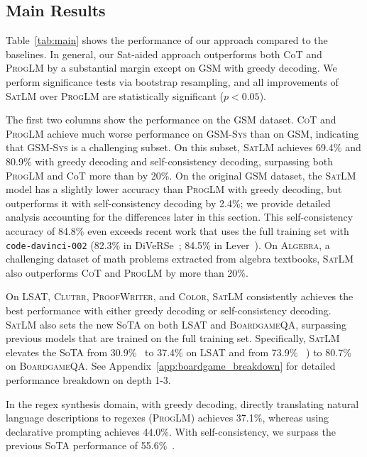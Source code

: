 \documentclass{article}
\theoremstyle{definition}
\newcommand\ttsmall[1]{\texttt{\small #1}}
\newcommand{\gsm}{\textsc{GSM}}
\newcommand{\gsmsys}{\textsc{GSM-Sys}}
\newcommand{\algebra}{\textsc{Algebra}}
\newcommand{\lsat}{\textsc{LSAT}}
\newcommand{\clutrr}{\textsc{Clutrr}}
\newcommand{\colorobj}{\textsc{Color}}
\newcommand{\proofwriter}{\textsc{ProofWriter}}
\newcommand{\boardgame}{\textsc{BoardgameQA}}
\newcommand{\cotlm}{\textsc{CoT}}
\newcommand{\satlm}{\textsc{SatLM}}
\newcommand{\pallm}{\textsc{ProgLM}}
\begin{document}
\subsection{Main Results}
Table~\ref{tab:main} shows the performance of our approach compared to the baselines. In general, our {\sc Sat}-aided approach outperforms both {\sc CoT} and \pallm{} by a substantial margin except on \gsm{} with greedy decoding. We perform significance tests via bootstrap resampling, and all improvements of \satlm{} over \pallm{} are statistically significant ($p < 0.05$).

The first two columns show the performance on the \gsm{} dataset. \cotlm{} and \pallm{} achieve much worse performance on \gsmsys{} than on \gsm{}, indicating that \gsmsys{} is a challenging subset. On this subset, \satlm{} achieves 69.4\% and 80.9\% with greedy decoding and self-consistency decoding, surpassing both \pallm{} and {\sc CoT} 
 more than by 20\%. On the original \gsm{} dataset, the \satlm{} model has a slightly lower accuracy than \pallm{} with greedy decoding, but outperforms it with self-consistency decoding by 2.4\%; we provide detailed analysis accounting for the differences later in this section.
This self-consistency accuracy of 84.8\% even exceeds recent work that uses the full training set with \ttsmall{code-davinci-002} (82.3\% in {\sc DiVeRSe}~\citep{li2022advance}; 84.5\% in {\sc Lever}~\citep{ni2023lever}). On \algebra{}, a challenging dataset of math problems extracted from algebra textbooks, \satlm{} also outperforms \cotlm{} and \pallm{} by more than 20\%.
 
On \lsat{}, \clutrr{}, \proofwriter{}, and \colorobj{}, \satlm{} consistently achieves the best performance with either greedy decoding or self-consistency decoding. 
\satlm{} also sets the new SoTA on both \lsat{} and \boardgame{}, surpassing previous models that are trained on the full training set. Specifically, \satlm{} elevates the SoTA from 30.9\%~\citep{arlsat} to 37.4\% on \lsat{} and from 73.9\% ~\citep{boardgameqa}) to 80.7\% on \boardgame{}. See Appendix~\ref{app:boardgame_breakdown} for detailed performance breakdown on depth 1-3.

In the regex synthesis domain, with greedy decoding, directly translating natural language descriptions to regexes (\pallm{}) achieves 37.1\%, whereas using declarative prompting achieves 44.0\%. With self-consistency, we surpass the previous SoTA performance of 55.6\%~\citep{opsynth}.
\end{document}
